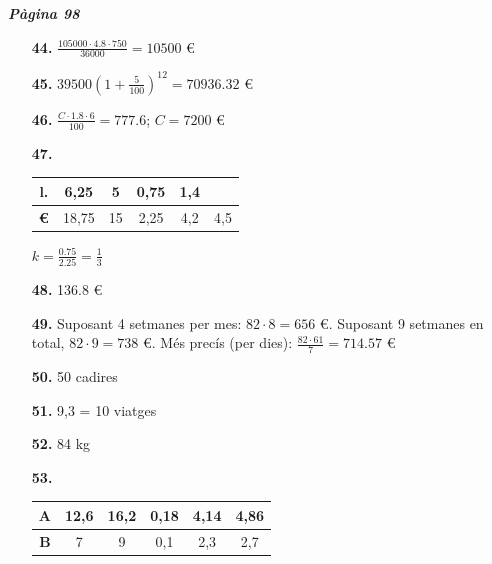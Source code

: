 \documentclass[a4paper, pdf, twoside]{book}
\begin{document}
\begin{multicols}{2}
{\textbf{\em Pàgina 98}} \hrulefill
\begin{enumerate}
\vspace{0.25cm}
\item[\fontfamily{phv}\selectfont\color{blue}\textbf{44. }] 
$\frac {105000\cdot 4.8 \cdot 750}{36000}=10500$ \euro {}
 \end{enumerate}
\begin{enumerate}
\vspace{0.25cm}
\item[\fontfamily{phv}\selectfont\color{blue}\textbf{45. }] 
$39500 \left (1+\frac {5}{100}\right )^{12} = 70936.32$ \euro {}
\vspace{0.25cm}
\item[\fontfamily{phv}\selectfont\color{blue}\textbf{46. }] 
$\frac {C \cdot 1.8 \cdot 6}{100}=777.6$; $C=7200$ \euro {}
\vspace{0.25cm}
\item[\fontfamily{phv}\selectfont\color{blue}\textbf{47. }] 
\begin {tabular}{|c|c|c|c|c|c|} \hline \textbf {l.} & 6,25 & 5 & 0,75 & 1,4 &\tabularnewline \hline \textbf {\euro {}} & 18,75 & 15 & 2,25 &4,2 & 4,5\tabularnewline \hline \end {tabular}\par $k=\frac {0.75}{2.25}=\frac {1}{3}$ 
\vspace{0.25cm}
\item[\fontfamily{phv}\selectfont\color{blue}\textbf{48. }] 
136.8 \euro {}
\vspace{0.25cm}
\item[\fontfamily{phv}\selectfont\color{blue}\textbf{49. }] 
Suposant 4 setmanes per mes: $82\cdot 8 =656$ \euro {}. Suposant 9 setmanes en total, $82\cdot 9 =738$ \euro {}. Més precís (per dies): $\frac {82\cdot 61}{7}=714.57$ \euro {} 
\vspace{0.25cm}
\item[\fontfamily{phv}\selectfont\color{blue}\textbf{50. }] 
50 cadires
\vspace{0.25cm}
\item[\fontfamily{phv}\selectfont\color{blue}\textbf{51. }] 
9,3 = 10 viatges
\vspace{0.25cm}
\item[\fontfamily{phv}\selectfont\color{blue}\textbf{52. }] 
84 kg
\vspace{0.25cm}
\item[\fontfamily{phv}\selectfont\color{blue}\textbf{53. }] 
\begin {tabular}{|c|c|c|c|c|c|} \toprule \textbf {A} & 12,6 & 16,2 & 0,18 & 4,14 & 4,86\tabularnewline \midrule \textbf {B} & 7 & 9 & 0,1 & 2,3 & 2,7\tabularnewline \bottomrule \end {tabular}

\end{enumerate}
\end{multicols}
\end{document}

